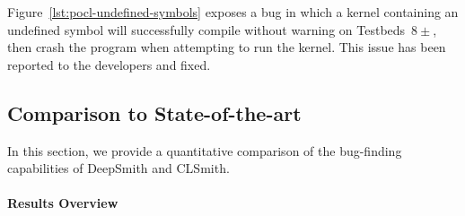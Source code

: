 Figure~\ref{lst:pocl-undefined-symbols} exposes a bug in which a kernel
containing an undefined symbol will successfully compile without warning on
Testbeds~$8\pm$, then crash the program when attempting to run the kernel. This
issue has been reported to the developers and fixed.

\subsection{Comparison to State-of-the-art}%
\label{subsec:vs_clsmith}

In this section, we provide a quantitative comparison of the bug-finding
capabilities of DeepSmith and CLSmith.

\paragraph{Results Overview}

\begin{table}
  \scriptsize %
  \centering %
  \caption{%
   Results from 48 hours of testing using CLSmith and DeepSmith. System \#. as
   per Table~\ref{tab:platforms}. $\pm$ denotes optimizations off ($-$) vs on
   ($+$). The remaining columns denote the number of build crash (\bc), build
   timeout (\bto), anomalous build failure (\abf), anomalous runtime crash
   (\arc), anomalous wrong-output (\awo), and pass (\textbf{\cmark}) results.
   \vspace{-1.1em}
  }
  
  \vspace{-1.1em}
  \label{tab:megatable}
\end{table}

